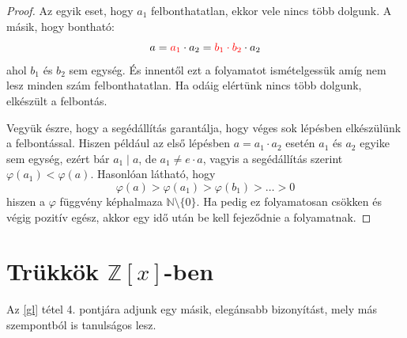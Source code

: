 \documentclass[12pt]{book}
\theoremstyle{plain} %
\theoremstyle{definition} %
\theoremstyle{remark}
\numberwithin{equation}{section}  %
\begin{document}
\begin{proof}
		Az egyik eset, hogy $a_1$ felbonthatatlan, ekkor vele nincs több dolgunk. A másik, hogy bontható:
		\[ a = \color{red} a_1 \color{black} \cdot a_2 = \color{red} b_1 \cdot b_2 \color{black} \cdot a_2  \]
		ahol $b_1$ és $b_2$ sem egység. És innentől ezt a folyamatot ismételgessük amíg nem lesz minden szám felbonthatatlan. Ha odáig elértünk nincs több dolgunk, elkészült a felbontás.
		
		Vegyük észre, hogy a segédállítás garantálja, hogy véges sok lépésben elkészülünk a felbontással. Hiszen például az első lépésben $a=a_1\cdot a_2$ esetén $a_1$ és $a_2$ egyike sem egység, ezért bár $a_1\mid a$, de $a_1 \neq e\cdot a$, vagyis a segédállítás szerint $\varphi(a_1)<\varphi(a)$. Hasonlóan látható, hogy
		\[ \varphi(a)>\varphi(a_1)>\varphi(b_1)>\ldots > 0  \]
		hiszen a $\varphi$ függvény képhalmaza $\mathbb{N}\setminus \{0\}$. Ha pedig ez folyamatosan csökken és végig pozitív egész, akkor egy idő után be kell fejeződnie a folyamatnak.
	\end{proof}
	

	\section{Trükkök $\mathbb{Z}[x]$-ben}
	Az \ref{gl} tétel 4. pontjára adjunk egy másik, elegánsabb bizonyítást, mely más szempontból is tanulságos lesz.
	
\end{document}
